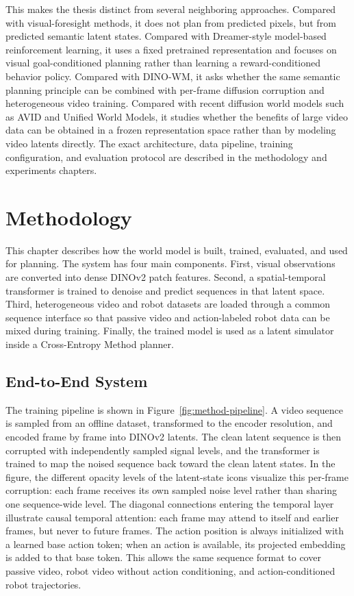 \documentclass[12pt]{report}
\begin{document}
This makes the thesis distinct from several neighboring approaches. Compared with visual-foresight methods, it does not plan from predicted pixels, but from predicted semantic latent states. Compared with Dreamer-style model-based reinforcement learning, it uses a fixed pretrained representation and focuses on visual goal-conditioned planning rather than learning a reward-conditioned behavior policy. Compared with DINO-WM, it asks whether the same semantic planning principle can be combined with per-frame diffusion corruption and heterogeneous video training. Compared with recent diffusion world models such as AVID and Unified World Models, it studies whether the benefits of large video data can be obtained in a frozen representation space rather than by modeling video latents directly. The exact architecture, data pipeline, training configuration, and evaluation protocol are described in the methodology and experiments chapters.

\chapter{Methodology}

\noindent
This chapter describes how the world model is built, trained, evaluated, and used for planning. The system has four main components. First, visual observations are converted into dense DINOv2 patch features. Second, a spatial-temporal transformer is trained to denoise and predict sequences in that latent space. Third, heterogeneous video and robot datasets are loaded through a common sequence interface so that passive video and action-labeled robot data can be mixed during training. Finally, the trained model is used as a latent simulator inside a Cross-Entropy Method planner.

\section{End-to-End System}
The training pipeline is shown in Figure~\ref{fig:method-pipeline}. A video sequence is sampled from an offline dataset, transformed to the encoder resolution, and encoded frame by frame into DINOv2 latents. The clean latent sequence is then corrupted with independently sampled signal levels, and the transformer is trained to map the noised sequence back toward the clean latent states. In the figure, the different opacity levels of the latent-state icons visualize this per-frame corruption: each frame receives its own sampled noise level rather than sharing one sequence-wide level. The diagonal connections entering the temporal layer illustrate causal temporal attention: each frame may attend to itself and earlier frames, but never to future frames. The action position is always initialized with a learned base action token; when an action is available, its projected embedding is added to that base token. This allows the same sequence format to cover passive video, robot video without action conditioning, and action-conditioned robot trajectories.
\end{document}
